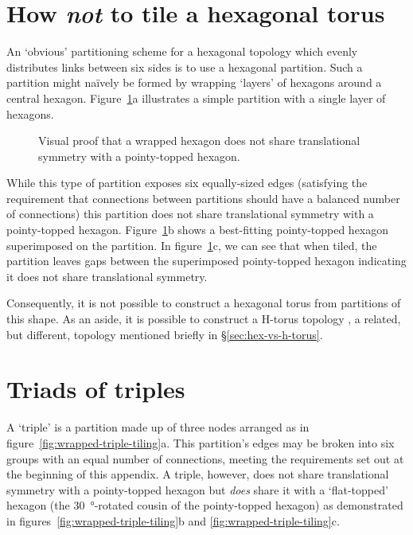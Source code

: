 	
	\section{How \emph{not} to tile a hexagonal torus}
	
		An `obvious' partitioning scheme for a hexagonal topology which evenly
		distributes links between six sides is to use a hexagonal partition. Such a
		partition might na\"ively be formed by wrapping `layers' of hexagons around
		a central hexagon. Figure~\ref{fig:wrapped-hexagon-tiling}a illustrates a
		simple partition with a single layer of hexagons.
		
		\begin{figure}
			\center
			
			\caption[A wraped hexagon does not tile a hexagonal torus.]%
			{Visual proof that a wrapped hexagon does not share translational
			symmetry with a pointy-topped hexagon.}
			\label{fig:wrapped-hexagon-tiling}
		\end{figure}
	
		While this type of partition exposes six equally-sized edges (satisfying
		the requirement that connections between partitions should have a balanced
		number of connections) this partition does not share translational symmetry
		with a pointy-topped hexagon. Figure~\ref{fig:wrapped-hexagon-tiling}b
		shows a best-fitting pointy-topped hexagon superimposed on the partition.
		In figure~\ref{fig:wrapped-hexagon-tiling}c, we can see that when tiled,
		the partition leaves gaps between the superimposed pointy-topped hexagon
		indicating it does not share translational symmetry.
		
		Consequently, it is not possible to construct a hexagonal torus from
		partitions of this shape. As an aside, it is possible to construct a
		H-torus topology \cite{zhao08}, a related, but different, topology
		mentioned briefly in \S\ref{sec:hex-vs-h-torus}.
	
	\section{Triads of triples}
		
		A `triple' is a partition made up of three nodes arranged as in
		figure~\ref{fig:wrapped-triple-tiling}a. This partition's edges may be
		broken into six groups with an equal number of connections, meeting the
		requirements set out at the beginning of this appendix. A triple, however,
		does not share translational symmetry with a pointy-topped hexagon but
		\emph{does} share it with a `flat-topped' hexagon (the
		\SI{30}{\degree}-rotated cousin of the pointy-topped hexagon) as
		demonstrated in figures~\ref{fig:wrapped-triple-tiling}b and
		\ref{fig:wrapped-triple-tiling}c.
		
